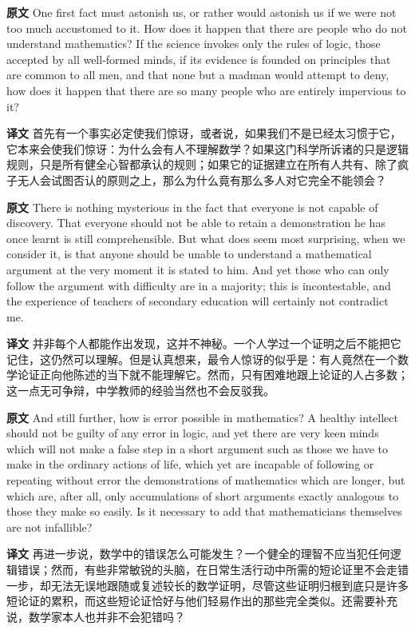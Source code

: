 \documentclass[UTF8,zihao=-4]{ctexart}
\newcommand{\BodyFont}{\fontsize{10.5pt}{15.5pt}\selectfont}
\newcommand{\origlabel}{\textbf{原文}\quad}
\newcommand{\translabel}{\textbf{译文}\quad}
\newenvironment{enblock}{\par\noindent\begingroup\BodyFont\origlabel}{\par\endgroup}
\newenvironment{zhblock}{\par\noindent\begingroup\BodyFont\translabel}{\par\endgroup\vspace{0.35em}}
\begin{document}
\begin{enblock}
One first fact must astonish us, or rather would astonish us if we were not too much accustomed to it. How does it happen that there are people who do not understand mathematics? If the science invokes only the rules of logic, those accepted by all well-formed minds, if its evidence is founded on principles that are common to all men, and that none but a madman would attempt to deny, how does it happen that there are so many people who are entirely impervious to it?
\end{enblock}
\begin{zhblock}
首先有一个事实必定使我们惊讶，或者说，如果我们不是已经太习惯于它，它本来会使我们惊讶：为什么会有人不理解数学？如果这门科学所诉诸的只是逻辑规则，只是所有健全心智都承认的规则；如果它的证据建立在所有人共有、除了疯子无人会试图否认的原则之上，那么为什么竟有那么多人对它完全不能领会？
\end{zhblock}

\begin{enblock}
There is nothing mysterious in the fact that everyone is not capable of discovery. That everyone should not be able to retain a demonstration he has once learnt is still comprehensible. But what does seem most surprising, when we consider it, is that anyone should be unable to understand a mathematical argument at the very moment it is stated to him. And yet those who can only follow the argument with difficulty are in a majority; this is incontestable, and the experience of teachers of secondary education will certainly not contradict me.
\end{enblock}
\begin{zhblock}
并非每个人都能作出发现，这并不神秘。一个人学过一个证明之后不能把它记住，这仍然可以理解。但是认真想来，最令人惊讶的似乎是：有人竟然在一个数学论证正向他陈述的当下就不能理解它。然而，只有困难地跟上论证的人占多数；这一点无可争辩，中学教师的经验当然也不会反驳我。\end{zhblock}

\begin{enblock}
And still further, how is error possible in mathematics? A healthy intellect should not be guilty of any error in logic, and yet there are very keen minds which will not make a false step in a short argument such as those we have to make in the ordinary actions of life, which yet are incapable of following or repeating without error the demonstrations of mathematics which are longer, but which are, after all, only accumulations of short arguments exactly analogous to those they make so easily. Is it necessary to add that mathematicians themselves are not infallible?
\end{enblock}
\begin{zhblock}
再进一步说，数学中的错误怎么可能发生？一个健全的理智不应当犯任何逻辑错误；然而，有些非常敏锐的头脑，在日常生活行动中所需的短论证里不会走错一步，却无法无误地跟随或复述较长的数学证明，尽管这些证明归根到底只是许多短论证的累积，而这些短论证恰好与他们轻易作出的那些完全类似。还需要补充说，数学家本人也并非不会犯错吗？\end{zhblock}
\end{document}
